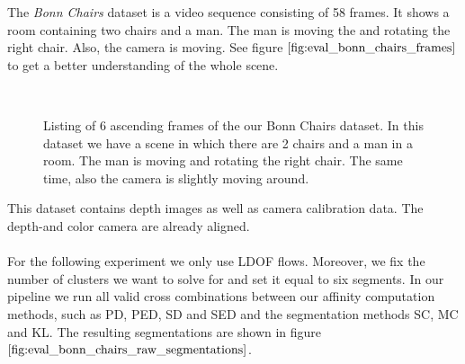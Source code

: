 The \textit{Bonn Chairs} dataset is a video sequence consisting of 58 frames. It shows a room containing two chairs and a man. The man is moving the and rotating the right chair. Also, the camera is moving. See figure $\ref{fig:eval_bonn_chairs_frames}$ to get a better understanding of the whole scene.
\begin{figure}[H]
\begin{center}
~
\end{center}
\caption[Bonn Chairs Dataset]{Listing of 6 ascending frames of the our Bonn Chairs dataset. In this dataset we have a scene in which there are 2 chairs and a man in a room. The man is moving and rotating the right chair. The same time, also the camera is slightly moving around.}
\label{fig:OLD_eval_bonn_chairs_frames}
\end{figure}
This dataset contains depth images as well as camera calibration data. The depth-and color camera are already aligned. \\ \\
For the following experiment we only use LDOF flows. Moreover, we fix the number of clusters we want to solve for and set it equal to six segments. In our pipeline we run all valid cross combinations between our affinity computation methods, such as PD, PED, SD and SED and the segmentation methods SC, MC and KL. The resulting segmentations are shown in figure $\ref{fig:eval_bonn_chairs_raw_segmentations}$. 
